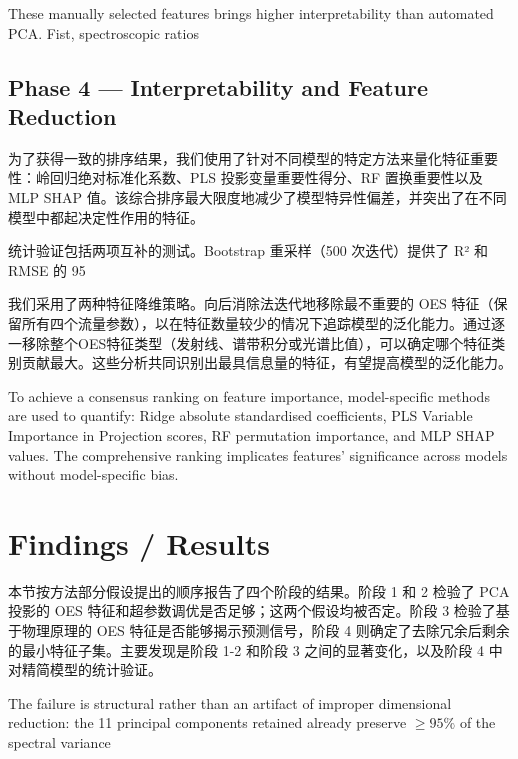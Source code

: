 These manually selected features brings higher interpretability than automated PCA. Fist, spectroscopic ratios 


\subsection{Phase 4 --- Interpretability and Feature Reduction}

为了获得一致的排序结果，我们使用了针对不同模型的特定方法来量化特征重要性：岭回归绝对标准化系数、PLS 投影变量重要性得分、RF 置换重要性以及 MLP SHAP 值。该综合排序最大限度地减少了模型特异性偏差，并突出了在不同模型中都起决定性作用的特征。

统计验证包括两项互补的测试。Bootstrap 重采样（500 次迭代）提供了 R² 和 RMSE 的 95%



我们采用了两种特征降维策略。向后消除法迭代地移除最不重要的 OES 特征（保留所有四个流量参数），以在特征数量较少的情况下追踪模型的泛化能力。通过逐一移除整个OES特征类型（发射线、谱带积分或光谱比值），可以确定哪个特征类别贡献最大。这些分析共同识别出最具信息量的特征，有望提高模型的泛化能力。

To achieve a consensus ranking on feature importance, model-specific methods are used to quantify: Ridge absolute standardised coefficients, PLS Variable Importance in Projection scores, RF permutation importance, and MLP SHAP values. The comprehensive ranking implicates features' significance across models without model-specific bias. 


\newpage
\section{Findings / Results}
\label{sec:results}

本节按方法部分假设提出的顺序报告了四个阶段的结果。阶段 1 和 2 检验了 PCA 投影的 OES 特征和超参数调优是否足够；这两个假设均被否定。阶段 3 检验了基于物理原理的 OES 特征是否能够揭示预测信号，阶段 4 则确定了去除冗余后剩余的最小特征子集。主要发现是阶段 1-2 和阶段 3 之间的显著变化，以及阶段 4 中对精简模型的统计验证。


The failure is structural rather than an artifact of improper dimensional reduction: the 11 principal components retained already preserve $\geq\!95\%$ of the spectral variance




